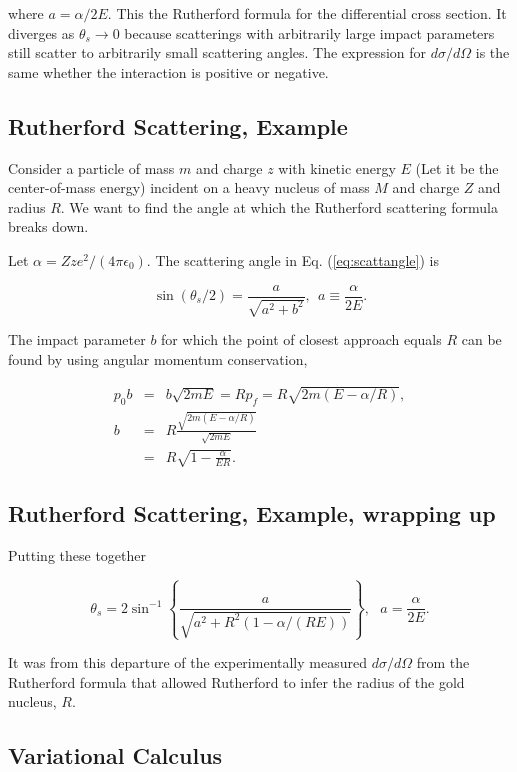\documentclass[%
oneside,                 %
final,                   %
10pt]{article}
\begin{document}
where $a= \alpha/2E$. This the Rutherford formula for the differential
cross section. It diverges as $\theta_s\rightarrow 0$ because
scatterings with arbitrarily large impact parameters still scatter to
arbitrarily small scattering angles. The expression for
$d\sigma/d\Omega$ is the same whether the interaction is positive or
negative.

\subsection*{Rutherford Scattering, Example}

Consider a particle of mass $m$ and charge $z$ with kinetic energy $E$
(Let it be the center-of-mass energy) incident on a heavy nucleus of
mass $M$ and charge $Z$ and radius $R$. We want to find the angle at which the
Rutherford scattering formula breaks down.

Let $\alpha=Zze^2/(4\pi\epsilon_0)$. The scattering angle in Eq. (\ref{eq:scattangle}) is 

\[
\sin(\theta_s/2)=\frac{a}{\sqrt{a^2+b^2}}, ~~a\equiv \frac{\alpha}{2E}.
\]

The impact parameter $b$ for which the point of closest approach
equals $R$ can be found by using angular momentum conservation,

\begin{eqnarray*}
p_0b&=&b\sqrt{2mE}=Rp_f=R\sqrt{2m(E-\alpha/R)},\\
b&=&R\frac{\sqrt{2m(E-\alpha/R)}}{\sqrt{2mE}}\\
&=&R\sqrt{1-\frac{\alpha}{ER}}.
\end{eqnarray*}

\subsection*{Rutherford Scattering, Example, wrapping up}

Putting these together

\[
\theta_s=2\sin^{-1}\left\{
\frac{a}{\sqrt{a^2+R^2(1-\alpha/(RE))}}
\right\},~~~a=\frac{\alpha}{2E}.
\]

It was from this departure of the experimentally measured
$d\sigma/d\Omega$ from the Rutherford formula that allowed Rutherford
to infer the radius of the gold nucleus, $R$.

\subsection*{Variational Calculus}
\end{document}
